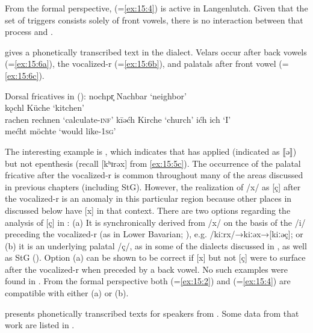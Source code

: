 {From the formal perspective,  (=\ref{ex:15:4}) is active in Langenlutch. Given that the set of triggers consists solely of front vowels, there is no interaction between that process and .

\citet{Graebisch1915} gives a phonetically transcribed text in the  dialect. Velars occur after back vowels (=\ref{ex:15:6a}), the vocalized-r (=\ref{ex:15:6b}), and palatals after front vowel (=\ref{ex:15:6c}).

\ea%
\label{ex:15:6}Dorsal fricatives in  ():
\ea\label{ex:15:6a} nochpr̥ \tab [noxpr̩] \tab Nachbar \tab ‘neighbor’\\
kǫchl \tab [kɔxl̩] \tab Küche \tab ‘kitchen’\\
rachen \tab [rɑxən] \tab rechnen \tab ‘calculate-\textsc{inf}’
\ex\label{ex:15:6b} kīəćh \tab [kiːəç] \tab Kirche \tab ‘church’
\ex\label{ex:15:6c} ićh  \tab  [iç] \tab ich \tab ‘I’\\
mećht \tab [meçt] \tab möchte \tab ‘would like-\textsc{1}\textsc{sg}’
\z
\z 

The interesting example is , which indicates that  has applied (indicated as ⟦ə⟧) but not epenthesis (recall [kʰɪrəx] from \ref{ex:15:5c}). The occurrence of the palatal fricative after the vocalized-r is common throughout many of the areas discussed in previous chapters (including StG). However, the realization of /x/ as [ç] after the vocalized-r is an anomaly in this particular region because other places in  discussed below have [x] in that context. There are two options regarding the analysis of [ç] in : (a) It is synchronically derived from /x/ on the basis of the /i/ preceding the vocalized-r (as in Lower Bavarian; ), e.g. /kiːrx/→{\textbar}kiːəx{\textbar}→[kiːəç]; or (b) it is an underlying palatal /ç/, as in some of the dialects discussed in , as well as StG (). Option (a) can be shown to be correct if [x] but not [ç] were to surface after the vocalized-r when preceded by a back vowel. No such examples were found in \citet{Graebisch1915}. From the formal perspective both  (=\ref{ex:15:2}) and  (=\ref{ex:15:4}) are compatible with either (a) or (b).

\citet{Seemüller1908c} presents phonetically transcribed texts for speakers from . Some data from that work are listed in .

}
